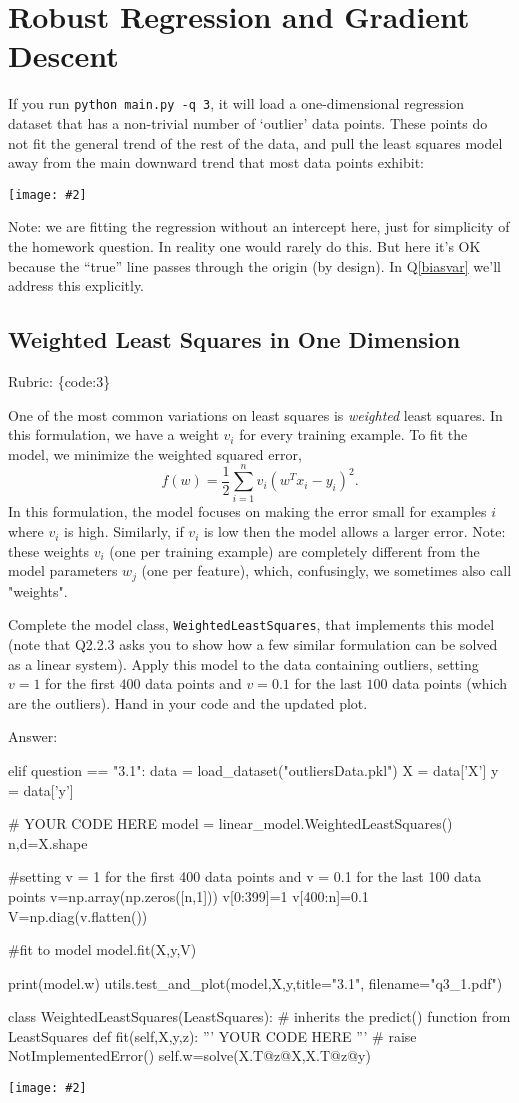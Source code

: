 \documentclass{article}
\def\rubric#1{\gre{Rubric: \{#1\}}}{}
\def\ans#1{\par\gre{Answer: #1}}
\def\blu#1{{\color{blu}#1}}
\def\gre#1{{\color{gre}#1}}
\newcommand{\centerfig}[2]{\begin{center}\texttt{[image: \#2]}\end{center}}
\begin{document}
\section{Robust Regression and Gradient Descent}

If you run \verb|python main.py -q 3|, it will load a one-dimensional regression
dataset that has a non-trivial number of `outlier' data points.
These points do not fit the general trend of the rest of the data,
and pull the least squares model away from the main downward trend that most data points exhibit:
\centerfig{.7}{../figs/least_squares_outliers.pdf}

Note: we are fitting the regression without an intercept here, just for simplicity of the homework question.
In reality one would rarely do this. But here it's OK because the ``true'' line
passes through the origin (by design). In Q\ref{biasvar} we'll address this explicitly.

\subsection{Weighted Least Squares in One Dimension}
\rubric{code:3}

One of the most common variations on least squares is \emph{weighted} least squares. In this formulation, we have a weight $v_i$ for every training example. To fit the model, we minimize the weighted squared error,
\[
f(w) =  \frac{1}{2}\sum_{i=1}^n v_i(w^Tx_i - y_i)^2.
\]
In this formulation, the model focuses on making the error small for examples $i$ where $v_i$ is high. Similarly, if $v_i$ is low then the model allows a larger error. Note: these weights $v_i$ (one per training example) are completely different from the model parameters $w_j$ (one per feature), which, confusingly, we sometimes also call "weights".

Complete the model class, \texttt{WeightedLeastSquares}, that implements this model
(note that Q2.2.3 asks you to show how a few similar formulation can be solved as a linear system).
Apply this model to the data containing outliers, setting $v = 1$ for the first
$400$ data points and $v = 0.1$ for the last $100$ data points (which are the outliers).
\blu{Hand in your code and the updated plot}.
\ans{}
\begin{python}
	elif question == "3.1":
	data = load_dataset("outliersData.pkl")
	X = data['X']
	y = data['y']
	
	# YOUR CODE HERE
	model = linear_model.WeightedLeastSquares()
	n,d=X.shape
	
	#setting v = 1 for the first 400 data points and v = 0.1 for the last 100 data points
	v=np.array(np.zeros([n,1]))
	v[0:399]=1
	v[400:n]=0.1
	V=np.diag(v.flatten())
	
	#fit to model
	model.fit(X,y,V)
	
	print(model.w)
	utils.test_and_plot(model,X,y,title="3.1", filename="q3_1.pdf")
\end{python}
\begin{python}
	class WeightedLeastSquares(LeastSquares): # inherits the predict() function from LeastSquares
	def fit(self,X,y,z):
	''' YOUR CODE HERE '''
	# raise NotImplementedError()
	self.w=solve(X.T@z@X,X.T@z@y)
\end{python}
\centerfig{1}{../figs/q3_1}
\end{document}
